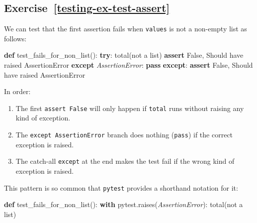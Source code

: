 \documentclass[
]{krantz}
\makeatletter
\newenvironment{Shaded}{\begin{snugshade}}{\end{snugshade}}
\newcommand{\ControlFlowTok}[1]{\textcolor[rgb]{0.13,0.29,0.53}{\textbf{#1}}}
\newcommand{\KeywordTok}[1]{\textcolor[rgb]{0.13,0.29,0.53}{\textbf{#1}}}
\newcommand{\NormalTok}[1]{#1}
\newcommand{\PreprocessorTok}[1]{\textcolor[rgb]{0.56,0.35,0.01}{\textit{#1}}}
\newcommand{\StringTok}[1]{\textcolor[rgb]{0.31,0.60,0.02}{#1}}
\newcommand{\VariableTok}[1]{\textcolor[rgb]{0.00,0.00,0.00}{#1}}
\newenvironment{kframe}{%
\medskip{}
\setlength{\fboxsep}{.8em}
 \def\at@end@of@kframe{}%
 \ifinner\ifhmode%
  \def\at@end@of@kframe{\end{minipage}}%
  \begin{minipage}{\columnwidth}%
 \fi\fi%
 \def\FrameCommand##1{\hskip\@totalleftmargin \hskip-\fboxsep
 \colorbox{shadecolor}{##1}\hskip-\fboxsep
     \hskip-\linewidth \hskip-\@totalleftmargin \hskip\columnwidth}%
 \MakeFramed {\advance\hsize-\width
   \@totalleftmargin\z@ \linewidth\hsize
   \@setminipage}}%
 {\par\unskip\endMakeFramed%
 \at@end@of@kframe}
\renewenvironment{Shaded}{\begin{kframe}}{\end{kframe}}
\makeatother
\begin{document}
\hypertarget{exercise-reftesting-ex-test-assert}{%
\subsection*{Exercise~\ref{testing-ex-test-assert}}\label{exercise-reftesting-ex-test-assert}}


We can test that the first assertion fails when \texttt{values} is not a non-empty list as follows:

\begin{Shaded}
\begin{Highlighting}[]
\KeywordTok{def}\NormalTok{ test\_fails\_for\_non\_list():}
    \ControlFlowTok{try}\NormalTok{:}
\NormalTok{        total(}\StringTok{\textquotesingle{}not a list\textquotesingle{}}\NormalTok{)}
        \ControlFlowTok{assert} \VariableTok{False}\NormalTok{, }\StringTok{\textquotesingle{}Should have raised AssertionError\textquotesingle{}}
    \ControlFlowTok{except} \PreprocessorTok{AssertionError}\NormalTok{:}
        \ControlFlowTok{pass}
    \ControlFlowTok{except}\NormalTok{:}
        \ControlFlowTok{assert} \VariableTok{False}\NormalTok{, }\StringTok{\textquotesingle{}Should have raised AssertionError\textquotesingle{}}
\end{Highlighting}
\end{Shaded}

In order:

\begin{enumerate}
\def\labelenumi{\arabic{enumi}.}
\item
  The first \texttt{assert\ False} will only happen if \texttt{total} runs without raising any kind of exception.
\item
  The \texttt{except\ AssertionError} branch does nothing (\texttt{pass}) if the correct exception is raised.
\item
  The catch-all \texttt{except} at the end makes the test fail if the wrong kind of exception is raised.
\end{enumerate}

This pattern is so common that \texttt{pytest} provides a shorthand notation for it:

\begin{Shaded}
\begin{Highlighting}[]
\KeywordTok{def}\NormalTok{ test\_fails\_for\_non\_list():}
    \ControlFlowTok{with}\NormalTok{ pytest.raises(}\PreprocessorTok{AssertionError}\NormalTok{):}
\NormalTok{        total(}\StringTok{\textquotesingle{}not a list\textquotesingle{}}\NormalTok{)}
\end{Highlighting}
\end{Shaded}
\end{document}
